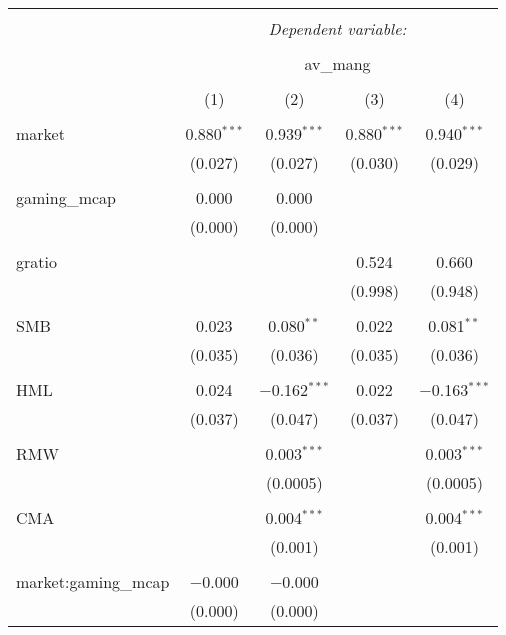 
\begin{table}[!htbp] \centering 
  \caption{} 
  \label{} 
\begin{tabular}{@{\extracolsep{5pt}}lcccc} 
\\[-1.8ex]\hline 
\hline \\[-1.8ex] 
 & \multicolumn{4}{c}{\textit{Dependent variable:}} \\ 
\cline{2-5} 
\\[-1.8ex] & \multicolumn{4}{c}{av\_mang} \\ 
\\[-1.8ex] & (1) & (2) & (3) & (4)\\ 
\hline \\[-1.8ex] 
 market & 0.880$^{***}$ & 0.939$^{***}$ & 0.880$^{***}$ & 0.940$^{***}$ \\ 
  & (0.027) & (0.027) & (0.030) & (0.029) \\ 
  & & & & \\ 
 gaming\_mcap & 0.000 & 0.000 &  &  \\ 
  & (0.000) & (0.000) &  &  \\ 
  & & & & \\ 
 gratio &  &  & 0.524 & 0.660 \\ 
  &  &  & (0.998) & (0.948) \\ 
  & & & & \\ 
 SMB & 0.023 & 0.080$^{**}$ & 0.022 & 0.081$^{**}$ \\ 
  & (0.035) & (0.036) & (0.035) & (0.036) \\ 
  & & & & \\ 
 HML & 0.024 & $-$0.162$^{***}$ & 0.022 & $-$0.163$^{***}$ \\ 
  & (0.037) & (0.047) & (0.037) & (0.047) \\ 
  & & & & \\ 
 RMW &  & 0.003$^{***}$ &  & 0.003$^{***}$ \\ 
  &  & (0.0005) &  & (0.0005) \\ 
  & & & & \\ 
 CMA &  & 0.004$^{***}$ &  & 0.004$^{***}$ \\ 
  &  & (0.001) &  & (0.001) \\ 
  & & & & \\ 
 market:gaming\_mcap & $-$0.000 & $-$0.000 &  &  \\ 
  & (0.000) & (0.000) &  &  \\ 

\end{tabular}
\end{table}
